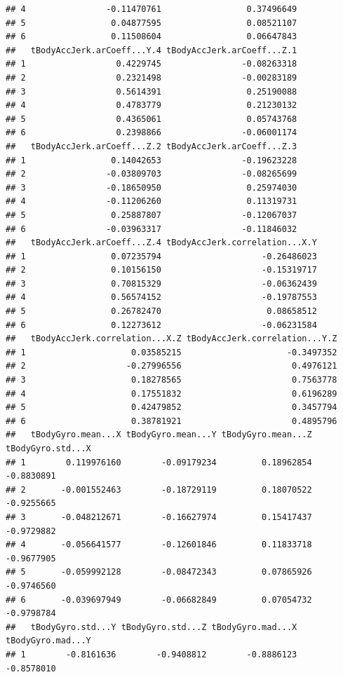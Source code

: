 \documentclass[
]{article}
\begin{document}
\begin{verbatim}
## 4                -0.11470761                 0.37496649
## 5                 0.04877595                 0.08521107
## 6                 0.11508604                 0.06647843
##   tBodyAccJerk.arCoeff...Y.4 tBodyAccJerk.arCoeff...Z.1
## 1                  0.4229745                -0.08263318
## 2                  0.2321498                -0.00283189
## 3                  0.5614391                 0.25190088
## 4                  0.4783779                 0.21230132
## 5                  0.4365061                 0.05743768
## 6                  0.2398866                -0.06001174
##   tBodyAccJerk.arCoeff...Z.2 tBodyAccJerk.arCoeff...Z.3
## 1                 0.14042653                -0.19623228
## 2                -0.03809703                -0.08265699
## 3                -0.18650950                 0.25974030
## 4                -0.11206260                 0.11319731
## 5                 0.25887807                -0.12067037
## 6                -0.03963317                -0.11846032
##   tBodyAccJerk.arCoeff...Z.4 tBodyAccJerk.correlation...X.Y
## 1                 0.07235794                    -0.26486023
## 2                 0.10156150                    -0.15319717
## 3                 0.70815329                    -0.06362439
## 4                 0.56574152                    -0.19787553
## 5                 0.26782470                     0.08658512
## 6                 0.12273612                    -0.06231584
##   tBodyAccJerk.correlation...X.Z tBodyAccJerk.correlation...Y.Z
## 1                     0.03585215                     -0.3497352
## 2                    -0.27996556                      0.4976121
## 3                     0.18278565                      0.7563778
## 4                     0.17551832                      0.6196289
## 5                     0.42479852                      0.3457794
## 6                     0.38781921                      0.4895796
##   tBodyGyro.mean...X tBodyGyro.mean...Y tBodyGyro.mean...Z tBodyGyro.std...X
## 1        0.119976160        -0.09179234         0.18962854        -0.8830891
## 2       -0.001552463        -0.18729119         0.18070522        -0.9255665
## 3       -0.048212671        -0.16627974         0.15417437        -0.9729882
## 4       -0.056641577        -0.12601846         0.11833718        -0.9677905
## 5       -0.059992128        -0.08472343         0.07865926        -0.9746560
## 6       -0.039697949        -0.06682849         0.07054732        -0.9798784
##   tBodyGyro.std...Y tBodyGyro.std...Z tBodyGyro.mad...X tBodyGyro.mad...Y
## 1        -0.8161636        -0.9408812        -0.8886123        -0.8578010

\end{verbatim}
\end{document}
